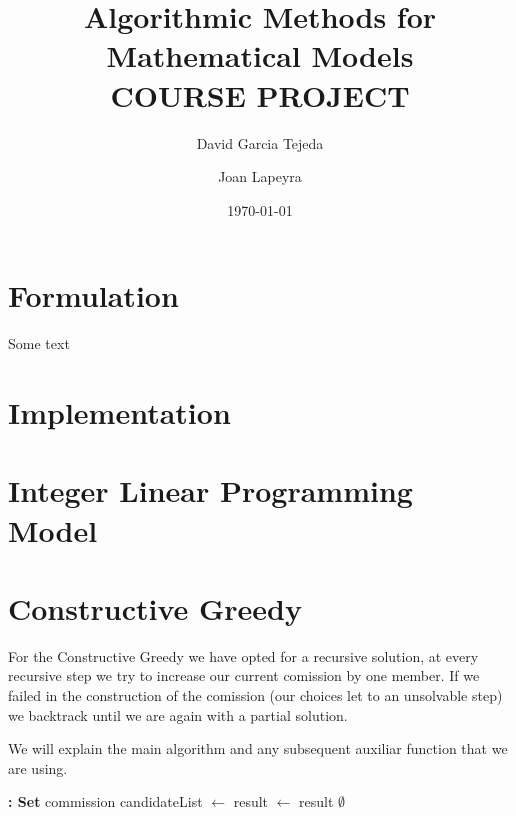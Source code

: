 \documentclass{article}
\title{%
  Algorithmic Methods for Mathematical Models\\
  \large COURSE PROJECT }
\author{David Garcia Tejeda \and Joan Lapeyra}
\date{\today}
\begin{document}
\maketitle

\section{Formulation}
Some text
\section{Implementation}
\section{Integer Linear Programming Model}

\newpage
\section{Constructive Greedy}

For the Constructive Greedy we have opted for a recursive solution, at every recursive step we try to increase our current comission by one member. If we failed in the construction of the comission (our choices let to an unsolvable step) we backtrack until we are again with a partial solution.

We will explain the main algorithm and any subsequent auxiliar function that we are using.

\begin{algorithm}[H]
\begin{algorithmic}[1]
 \textbf{: Set}
        \State \Return commission
    \EndIf
    \State candidateList $\gets$ 
        \State result $\gets$ 
            \State \Return result
        \EndIf
    \EndFor
    \State \Return $\emptyset$
\EndFunction
\end{algorithmic}
\end{algorithm}
\end{document}
